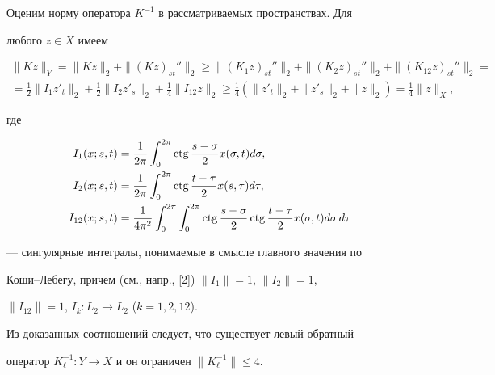 Оценим норму оператора $K^{-1}$ в рассматриваемых пространствах. Для  


любого $z\in X$ имеем 


\begin{gather*} 


\|Kz\|_Y=\|Kz\|_2+\|(Kz)_{st}''\|_2\ge\|(K_1z)_{st}''\|_2+ 


\|(K_2z)_{st}''\|_2+\|(K_{12}z)_{st}''\|_2=\\ 


% 


=\frac{1}{2}\|I_1z'_t\|_2+\frac{1}{2}\|I_2z'_s\|_2+ 


\frac{1}{4}\|I_{12}z\|_2\ge\frac{1}{4} 


(\|z'_t\|_2+\|z'_s\|_2+\|z\|_2)=\frac{1}{4}\|z\|_X, 


\end{gather*} 


где 


\begin{align*} 


I_1(x;s,t)&=\frac{1}{2\pi}\int^{2\pi}_0\ctg 


\frac{s-\sigma}{2}x(\sigma,t)d\sigma,\\ 


% 


I_2(x;s,t)&=\frac{1}{2\pi}\int^{2\pi}_0\ctg 


\frac{t-\tau}{2}x(s,\tau)d\tau,\\


% 


I_{12}(x;s,t)&=\frac{1}{4\pi^2}\int^{2\pi}_0\int^{2\pi}_0 


\ctg\frac{s-\sigma}{2}\ctg\frac{t-\tau}{2} 


x(\sigma,t)d\sigma\,d\tau 


\end{align*} 


--- сингулярные интегралы, понимаемые в смысле главного значения по  


Коши--Лебегу, причем (см., напр., [2]) $\|I_1\|=1$, $\|I_2\|=1$, 


$\|I_{12}\|=1$, $I_k:L_2\to L_2$ ($k=1,2,12$). 


 


Из доказанных соотношений следует, что существует левый обратный  


оператор $K^{-1}_\ell:Y\to X$ и он ограничен $\|K^{-1}_\ell\|\le4$. 


 


